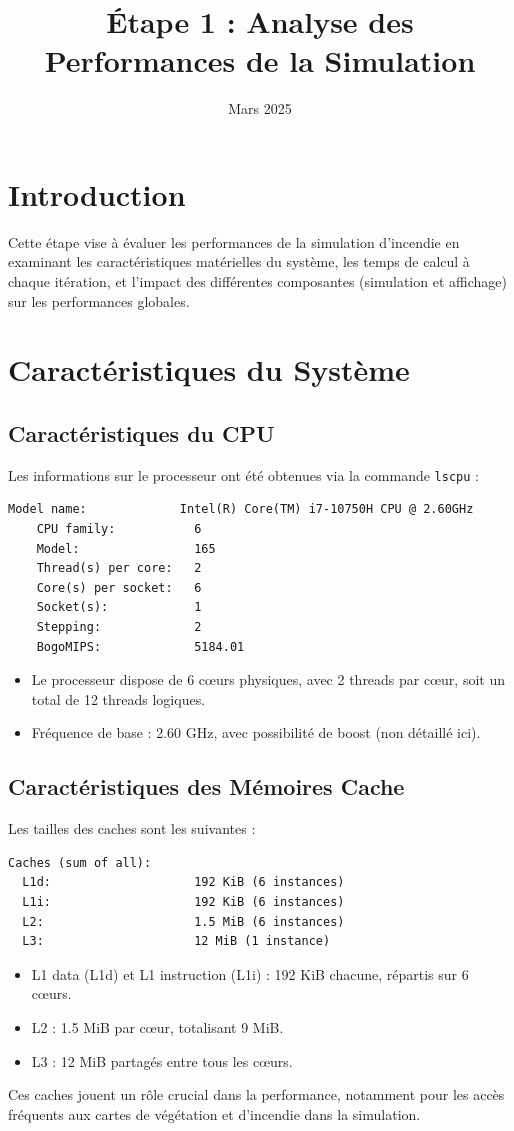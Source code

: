 \documentclass[a4paper,12pt]{article}
\title{Étape 1 : Analyse des Performances de la Simulation}
\author{}
\date{Mars 2025}
\begin{document}
\maketitle

\section{Introduction}
Cette étape vise à évaluer les performances de la simulation d'incendie en examinant les caractéristiques matérielles du système, les temps de calcul à chaque itération, et l'impact des différentes composantes (simulation et affichage) sur les performances globales.

\section{Caractéristiques du Système}

\subsection{Caractéristiques du CPU}
Les informations sur le processeur ont été obtenues via la commande \texttt{lscpu} :
\begin{verbatim}
Model name:             Intel(R) Core(TM) i7-10750H CPU @ 2.60GHz
    CPU family:           6
    Model:                165
    Thread(s) per core:   2
    Core(s) per socket:   6
    Socket(s):            1
    Stepping:             2
    BogoMIPS:             5184.01
\end{verbatim}
\begin{itemize}
    \item Le processeur dispose de 6 cœurs physiques, avec 2 threads par cœur, soit un total de 12 threads logiques.
    \item Fréquence de base : 2.60 GHz, avec possibilité de boost (non détaillé ici).
\end{itemize}

\subsection{Caractéristiques des Mémoires Cache}
Les tailles des caches sont les suivantes :
\begin{verbatim}
Caches (sum of all):      
  L1d:                    192 KiB (6 instances)
  L1i:                    192 KiB (6 instances)
  L2:                     1.5 MiB (6 instances)
  L3:                     12 MiB (1 instance)
\end{verbatim}
\begin{itemize}
    \item L1 data (L1d) et L1 instruction (L1i) : 192 KiB chacune, répartis sur 6 cœurs.
    \item L2 : 1.5 MiB par cœur, totalisant 9 MiB.
    \item L3 : 12 MiB partagés entre tous les cœurs.
\end{itemize}
Ces caches jouent un rôle crucial dans la performance, notamment pour les accès fréquents aux cartes de végétation et d'incendie dans la simulation.
\end{document}
